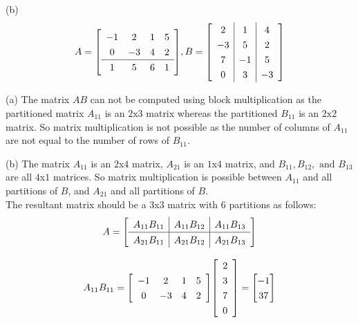 \documentclass[addpoints]{exam}
\begin{document}
\begin{sloppypar}
\begin{questions}
    (b) \[ A = \renewcommand\arraystretch{1.3}
    \mleft[ 
    \begin{array}{cccc}
        -1 & 2 & 1 & 5 \\ 
        0 & -3 & 4 & 2 \\ 
        \hline
        1 & 5 & 6 & 1
    \end{array}
    \mright], B = \renewcommand\arraystretch{1.3}
    \mleft[
    \begin{array}{c|c|c}
        2 & 1 & 4 \\ 
        -3 & 5 & 2 \\  
        7 & -1 & 5 \\ 
        0 & 3 & -3
    \end{array}
    \mright] \]
    \begin{solution}
        
        (a) The matrix $AB$ can not be computed using block multiplication as the partitioned matrix $A_{11}$ is an $ 2 \text{x} 3 $ matrix whereas the partitioned $B_{11}$ is an $ 2 \text{x} 2 $ matrix. So matrix multiplication is not possible as the number of columns of $A_{11}$ are not equal to the number of rows of $B_{11}$.

        (b) The matrix $ A_{11} $ is an $2$x$4$ matrix, $A_{21}$ is an $1$x$4$ matrix, and  $B_{11}, B_{12}, \text{ and } B_{13}$ are all $4$x$1$ matrices. So matrix multiplication is possible between $A_{11}$ and all partitions of $B$, and $A_{21}$ and all partitions of $B$. \\ 
        The resultant matrix should be a $3$x$3$ matrix with 6 partitions as follows:\[ A = \renewcommand\arraystretch{1.3}
        \mleft[ 
        \begin{array}{c|c|c}
            A_{11}B_{11} & A_{11}B_{12} & A_{11}B_{13} \\
            \hline 
            A_{21}B_{11} & A_{21}B_{12} & A_{21}B_{13}
        \end{array}
        \mright]\]

        \[ A_{11}B_{11} = \renewcommand\arraystretch{1.3}
        \mleft[ 
        \begin{array}{cccc}
            -1 & 2 & 1 & 5 \\ 
            0 & -3 & 4 & 2
        \end{array}
        \mright] \renewcommand\arraystretch{1.3}
        \mleft[
        \begin{array}{c}
            2 \\ 3 \\ 7 \\ 0
        \end{array}
        \mright] = \begin{bmatrix}
            -1 \\ 37
        \end{bmatrix}\]


\end{solution}
\end{questions}
\end{sloppypar}
\end{document}
